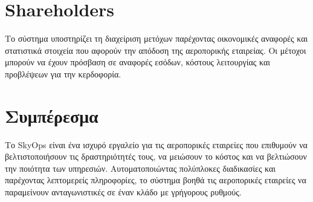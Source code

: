 \documentclass{article}
\begin{document}
	\section{Shareholders}
	Το σύστημα υποστηρίζει τη διαχείριση μετόχων παρέχοντας οικονομικές αναφορές και
	στατιστικά στοιχεία που αφορούν την απόδοση της αεροπορικής εταιρείας.
	Οι μέτοχοι μπορούν να έχουν πρόσβαση σε αναφορές εσόδων,
	κόστους λειτουργίας και προβλέψεων για την κερδοφορία.
	
	
	\section{Συμπέρεσμα}
	Το SkyOps είναι ένα ισχυρό εργαλείο για τις 
	αεροπορικές εταιρείες που επιθυμούν να βελτιστοποιήσουν τις 
	δραστηριότητές τους, να μειώσουν το κόστος και να βελτιώσουν 
	την ποιότητα των υπηρεσιών. Αυτοματοποιώντας πολύπλοκες 
	διαδικασίες και παρέχοντας λεπτομερείς πληροφορίες, το σύστημα 
	βοηθά τις αεροπορικές εταιρείες να παραμείνουν ανταγωνιστικές 
	σε έναν κλάδο με γρήγορους ρυθμούς.
	
\end{document}

